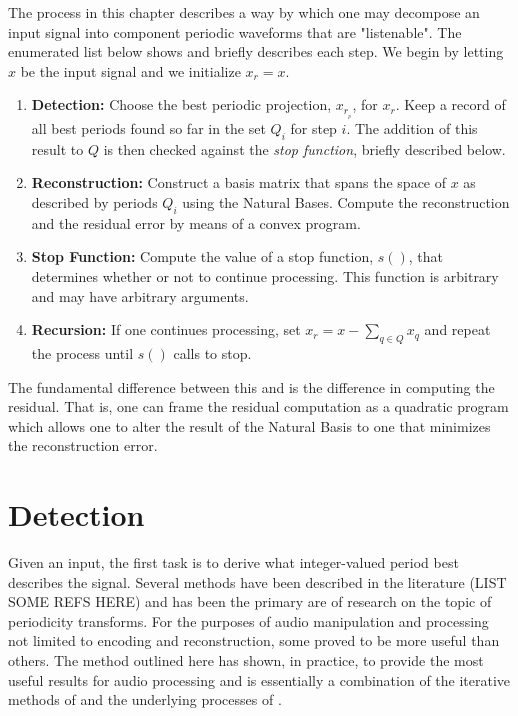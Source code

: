 The process in this chapter describes a way by which one may decompose an input signal into component periodic waveforms that are "listenable". The enumerated list below shows and briefly describes each step. We begin by letting $x$ be the input signal and we initialize $x_r = x$.
\begin{enumerate}
    \item\textbf{Detection:} Choose the best periodic projection, $x_{r_{_p}}$, for $x_r$. Keep a record of all best periods found so far in the set $Q_i$ for step $i$. The addition of this result to $Q$ is then checked against the \emph{stop function}, briefly described below.
    \item\textbf{Reconstruction:} Construct a basis matrix that spans the space of $x$ as described by periods $Q_i$ using the Natural Bases. Compute the reconstruction and the residual error by means of a convex program.
    \item\textbf{Stop Function:} Compute the value of a stop function, $s()$, that determines whether or not to continue processing. This function is arbitrary and may have arbitrary arguments.
    \item\textbf{Recursion:} If one continues processing, set $x_r = x - \sum_{q \in Q} x_q$ and repeat the process until $s()$ calls to stop.
\end{enumerate}
The fundamental difference between this and \cite{sethares1999periodicity} is the difference in computing the residual. That is, one can frame the residual computation as a quadratic program which allows one to alter the result of the Natural Basis to one that minimizes the reconstruction error.


\section{Detection}
Given an input, the first task is to derive what integer-valued period best describes the signal. Several methods have been described in the literature (LIST SOME REFS HERE) and has been the primary are of research on the topic of periodicity transforms. For the purposes of audio manipulation and processing not limited to encoding and reconstruction, some proved to be more useful than others. The method outlined here has shown, in practice, to provide the most useful results for audio processing and is essentially a combination of the iterative methods of \cite{sethares1999periodicity} and the underlying processes of \cite{muresan2003orthogonal}.

